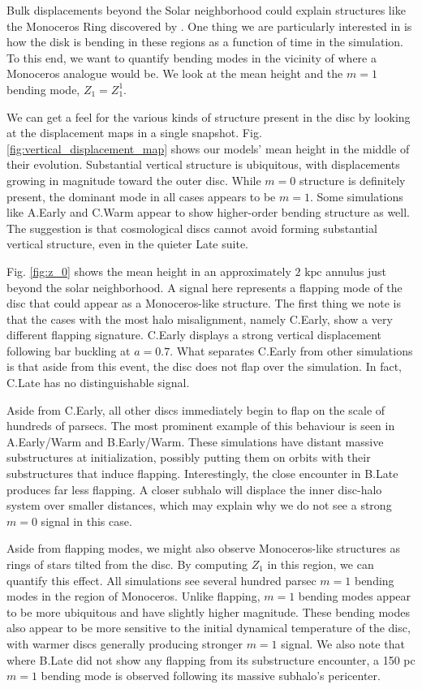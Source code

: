 Bulk displacements beyond the Solar neighborhood could explain structures like the Monoceros Ring discovered by \citet{newberg_2002}. One thing we are particularly interested in is how the disk is bending in these regions as a function of time in the simulation. To this end, we want to quantify bending modes in the vicinity of where a Monoceros analogue would be. We look at the mean height and the $m=1$ bending mode, $Z_1 = Z_1^1$.

We can get a feel for the various kinds of structure present in the disc by looking at the displacement maps in a single snapshot. Fig. \ref{fig:vertical_displacement_map} shows our models' mean height in the middle of their evolution. Substantial vertical structure is ubiquitous, with displacements growing in magnitude toward the outer disc. While $m=0$ structure is definitely present, the dominant mode in all cases appears to be $m=1$. Some simulations like A.Early and C.Warm appear to show higher-order bending structure as well. The suggestion is that cosmological discs cannot avoid forming substantial vertical structure, even in the quieter Late suite.

Fig. \ref{fig:z_0} shows the mean height in an approximately $2 \text{ kpc}$ annulus just beyond the solar neighborhood. A signal here represents a flapping mode of the disc that could appear as a Monoceros-like structure. The first thing we note is that the cases with the most halo misalignment, namely C.Early, show a very different flapping signature. C.Early displays a strong vertical displacement following bar buckling at $a=0.7$.  What separates C.Early from other simulations is that aside from this event, the disc does not flap over the simulation. In fact, C.Late has no distinguishable signal.

Aside from C.Early, all other discs immediately begin to flap on the scale of hundreds of parsecs. The most prominent example of this behaviour is seen in A.Early/Warm and B.Early/Warm. These simulations have distant massive substructures at initialization, possibly putting them on orbits with their substructures that induce flapping. Interestingly, the close encounter in B.Late produces far less flapping. A closer subhalo will displace the inner disc-halo system over smaller distances, which may explain why we do not see a strong $m=0$ signal in this case.

Aside from flapping modes, we might also observe Monoceros-like structures as rings of stars tilted from the disc. By computing $Z_1$ in this region, we can quantify this effect. All simulations see several hundred parsec $m=1$ bending modes in the region of Monoceros. Unlike flapping, $m=1$ bending modes appear to be more ubiquitous and have slightly higher magnitude. These bending modes also appear to be more sensitive to the initial dynamical temperature of the disc, with warmer discs generally producing stronger $m=1$ signal. We also note that where B.Late did not show any flapping from its substructure encounter, a 150 pc $m=1$ bending mode is observed following its massive subhalo's pericenter.

